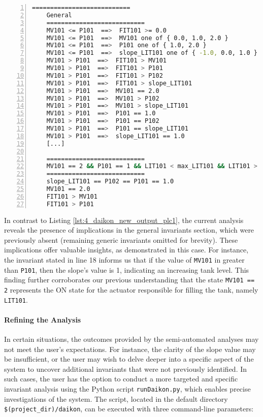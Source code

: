 \begin{lstlisting}[language=bash,numbers=left,caption={Daikon outcomes for the system configuration \texttt{MV101 == 2, P101 == 1} on \texttt{LIT101}},label=lst:4_current_system_config_analysis]
	===========================
	General
	===========================
	MV101 <= P101  ==>  FIT101 >= 0.0
	MV101 <= P101  ==>  MV101 one of { 0.0, 1.0, 2.0 }
	MV101 <= P101  ==>  P101 one of { 1.0, 2.0 }
	MV101 <= P101  ==>  slope_LIT101 one of { -1.0, 0.0, 1.0 }
	MV101 > P101  ==>  FIT101 > MV101
	MV101 > P101  ==>  FIT101 > P101
	MV101 > P101  ==>  FIT101 > P102
	MV101 > P101  ==>  FIT101 > slope_LIT101
	MV101 > P101  ==>  MV101 == 2.0
	MV101 > P101  ==>  MV101 > P102
	MV101 > P101  ==>  MV101 > slope_LIT101
	MV101 > P101  ==>  P101 == 1.0
	MV101 > P101  ==>  P101 == P102
	MV101 > P101  ==>  P101 == slope_LIT101
	MV101 > P101  ==>  slope_LIT101 == 1.0
	[...]
	
	===========================
	MV101 == 2 && P101 == 1 && LIT101 < max_LIT101 && LIT101 > min_LIT101
	===========================
	slope_LIT101 == P102 == P101 == 1.0
	MV101 == 2.0
	FIT101 > MV101
	FIT101 > P101
\end{lstlisting}

\noindent In contrast to Listing \ref{lst:4_daikon_new_output_plc1}, the current analysis reveals the presence of implications in the general invariants section, which were previously absent (remaining generic invariants omitted for brevity). These implications offer valuable insights, as demonstrated in this case. For instance, the invariant stated in line 18 informs us that if the value of \texttt{MV101} in greater than \texttt{P101}, then the slope's value is 1, indicating an increasing tank level. This finding further corroborates our previous understanding that the state \texttt{MV101 == 2} represents the ON state for the actuator responsible for filling the tank, namely \texttt{LIT101}. 

\paragraph{Refining the Analysis}
\label{par:4_refining_analysis}
In certain situations, the outcomes provided by the semi-automated analyses may not meet the user's expectations. For instance, the clarity of the slope value may be insufficient, or the user may wish to delve deeper into a specific aspect of the system to uncover additional invariants that were not previously identified. In such cases, the user has the option to conduct a more targeted and specific invariant analysis using the Python script \texttt{runDaikon.py}, which enables precise investigations of the system.\newline
The script, located in the default directory \texttt{\$(project\_dir)/daikon}, can be executed with three command-line parameters:

